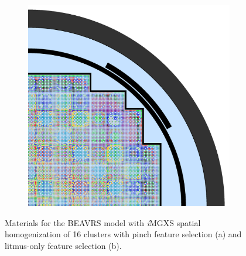 \begin{figure}[h!]
\begin{subfigure}{0.67\textwidth}
  \includegraphics[width=\linewidth]{figures/unsupervised/geometries/with-features/16-clusters/combined/full-core}
  \caption{}
  \label{fig:chap10-full-core-combined-16}
\end{subfigure}
\caption[Clustered geometries for BEAVRS]{Materials for the \ac{BEAVRS} model with \textit{i}\ac{MGXS} spatial homogenization of 16 clusters with pinch feature selection (a) and litmus-only feature selection (b).}
\label{fig:chap10-full-core-geometries-16}
\end{figure}

\clearpage

